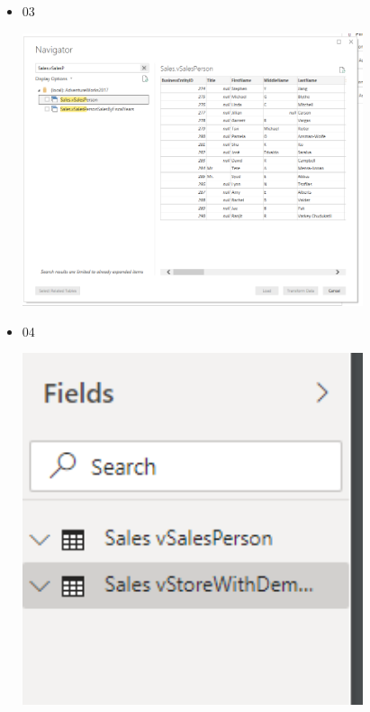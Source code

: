 \begin{itemize}
	\item 03
	\begin{center}
	\includegraphics[width=10cm]{./Imagenes/3} 
	\end{center}
\end{itemize} 

\begin{itemize}
	\item 04
	\begin{center}
	\includegraphics[width=10cm]{./Imagenes/4} 
	\end{center}
\end{itemize} 

